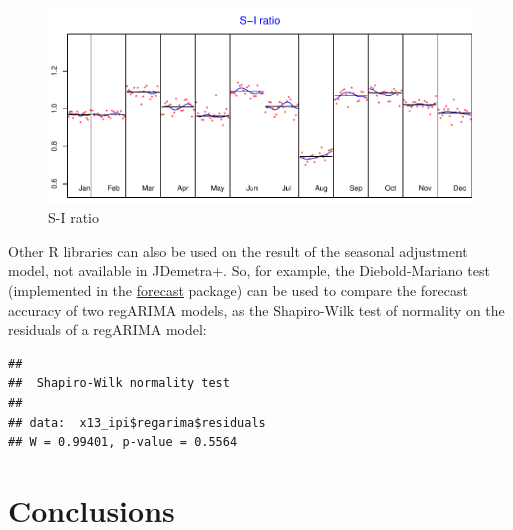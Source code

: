 \documentclass[12pt,a4paper]{article}
\newenvironment{Shaded}{\begin{snugshade}}{\end{snugshade}}
\newcommand{\KeywordTok}[1]{\textcolor[rgb]{0.13,0.29,0.53}{\textbf{#1}}}
\newcommand{\OperatorTok}[1]{\textcolor[rgb]{0.81,0.36,0.00}{\textbf{#1}}}
\newcommand{\NormalTok}[1]{#1}
\begin{document}
\begin{figure}[H]
\centering
\includegraphics{NTTS_files/figure-latex/unnamed-chunk-3-1.pdf}
\caption{\label{fig:sa_si_ratio}S-I ratio}
\end{figure}

Other R libraries can also be used on the result of the seasonal
adjustment model, not available in JDemetra+. So, for example, the
Diebold-Mariano test (implemented in the
\href{ttps://CRAN.R-project.org/package=forecast}{forecast} package) can
be used to compare the forecast accuracy of two regARIMA models, as the
Shapiro-Wilk test of normality on the residuals of a regARIMA model:

\begin{Shaded}
\end{Shaded}

\begin{verbatim}
## 
##  Shapiro-Wilk normality test
## 
## data:  x13_ipi$regarima$residuals
## W = 0.99401, p-value = 0.5564
\end{verbatim}

\section{Conclusions}\label{conclusions}
\end{document}
